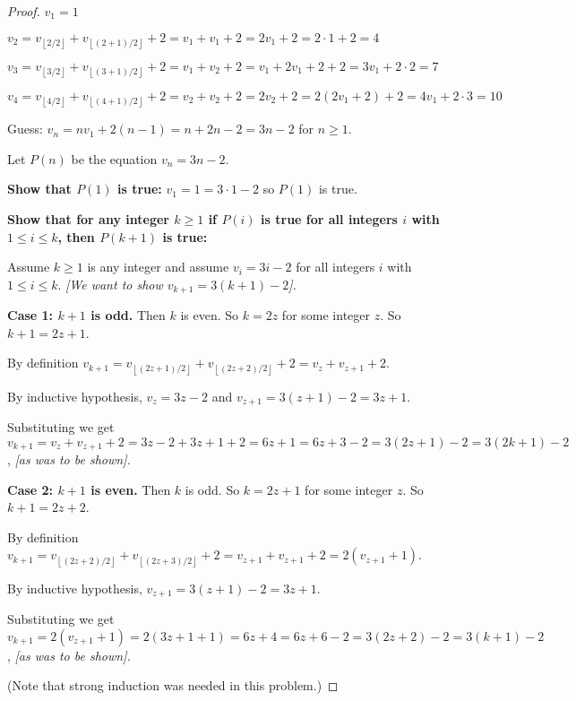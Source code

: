 \documentclass[14pt]{extarticle}
\newcommand{\dps}{\displaystyle}
\newcommand{\floor}[1]{{\left\lfloor#1\right\rfloor}}
\begin{document}
\begin{proof}
    \(v_1 = 1\)

    \(\dps v_2 = v_{\floor{2/2}} + v_{\floor{(2+1)/2}} + 2 = v_1 + v_1 + 2 = 2v_1 + 2 = 2 \cdot 1 + 2 = 4\)

    \(\dps v_3 = v_{\floor{3/2}} + v_{\floor{(3+1)/2}} + 2 = v_1 + v_2 + 2 = v_1 + 2v_1 + 2 + 2 = 3v_1 + 2 \cdot 2 = 7\)

    \(\dps v_4 = v_{\floor{4/2}} + v_{\floor{(4+1)/2}} + 2 = v_2 + v_2 + 2 = 2v_2 + 2 = 2(2v_1 + 2) + 2 = 4v_1 + 2 \cdot 3 = 10\)

    Guess: \(v_n = nv_1 + 2(n-1) = n + 2n - 2 = 3n - 2\) for \(n \geq 1\).

    Let \(P(n)\) be the equation \(v_n = 3n-2\).

        {\bf Show that $P(1)$ is true:} \(v_1 = 1 = 3 \cdot 1 - 2\) so $P(1)$ is true.

        {\bf Show that for any integer \(k \geq 1\) if $P(i)$ is true for all integers $i$ with \(1 \leq i \leq k\), then
            $P(k+1)$ is true:}

    Assume \(k \geq 1\) is any integer and assume \(v_i = 3i-2\) for all integers $i$ with \(1 \leq i \leq k\).
        {\it [We want to show \(v_{k+1} = 3(k+1) - 2\)].}

        {\bf Case 1: $k+1$ is odd.} Then $k$ is even. So $k = 2z$ for some integer $z$. So $k+1 = 2z+1$.

    By definition \(v_{k+1} = v_{\floor{(2z+1)/2}} + v_{\floor{(2z+2)/2}} + 2 = v_z + v_{z+1} + 2\).

    By inductive hypothesis, \(v_z = 3z - 2\) and \(v_{z+1} = 3(z+1) - 2 = 3z+1\).

    Substituting we get \(v_{k+1} = v_z + v_{z+1} + 2 = 3z-2 + 3z+1 + 2 = 6z + 1 = 6z+3 - 2 = 3(2z+1) - 2 = 3(2k+1) - 2\),
    {\it [as was to be shown].}

        {\bf Case 2: $k+1$ is even.} Then $k$ is odd. So $k = 2z+1$ for some integer $z$. So $k+1 = 2z+2$.

    By definition \(v_{k+1} = v_{\floor{(2z+2)/2}} + v_{\floor{(2z+3)/2}} + 2 = v_{z+1} + v_{z+1} + 2 = 2(v_{z+1} + 1)\).

    By inductive hypothesis, \(v_{z+1} = 3(z+1) - 2 = 3z+1\).

    Substituting we get \(v_{k+1} = 2(v_{z+1} + 1) = 2(3z+1 + 1) = 6z + 4 = 6z + 6 - 2 = 3(2z + 2) - 2 = 3(k+1) - 2\),
    {\it [as was to be shown].}

    (Note that strong induction was needed in this problem.)
\end{proof}
\end{document}

